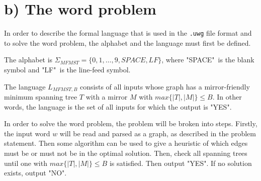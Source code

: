 \section*{b) The word problem}

In order to describe the formal language that is used in the \texttt{.uwg} file format and to solve the word problem, the alphabet and the language must first be defined. 

The alphabet is $\Sigma_{MFMST}=\{0,1,\dotsc,9,SPACE,LF\}$, where "SPACE"\ is the blank symbol and "LF"\ is the line-feed symbol. 

The language $L_{MFMST,B}$ consists of all inputs whose graph has a mirror-friendly minimum spanning tree $T$ with a mirror $M$ with $max\{|T|,|M|\}\leq B$. In other words, the language is the set of all inputs for which the output is "YES". 

In order to solve the word problem, the problem will be broken into steps. Firstly, the input word $w$ will be read and parsed as a graph, as described in the problem statement. Then some algorithm can be used to give a heuristic of which edges must be or must not be in the optimal solution. Then, check all spanning trees until one with $max\{|T|,|M|\}\leq B$ is satisfied. Then output "YES". If no solution exists, output "NO". 
